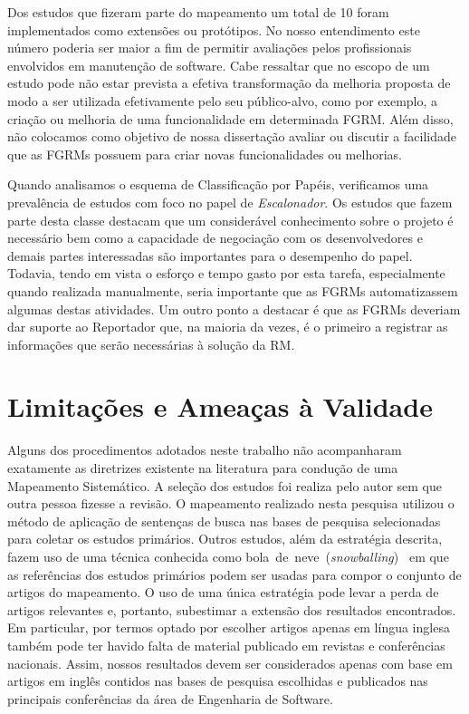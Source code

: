 Dos estudos que fizeram parte do mapeamento um total de 10 foram implementados
como extensões ou protótipos. No nosso entendimento este número poderia ser
maior a fim de permitir avaliações pelos profissionais envolvidos em manutenção
de software. Cabe ressaltar que no escopo de um estudo pode não estar prevista
a efetiva transformação da melhoria proposta de modo a ser utilizada
efetivamente pelo seu público-alvo, como por exemplo, a criação ou melhoria de
uma funcionalidade em determinada FGRM\@. Além disso, não colocamos como
objetivo de nossa dissertação avaliar ou discutir a facilidade que as FGRMs
possuem para criar novas funcionalidades ou melhorias.

Quando analisamos o esquema de Classificação por Papéis, verificamos uma
prevalência de estudos com foco no papel de \textit{Escalonador}. Os estudos
que fazem parte desta classe destacam que um considerável conhecimento sobre o
projeto é necessário bem como a capacidade de negociação com os desenvolvedores
e demais partes interessadas são importantes para o desempenho do papel.
Todavia, tendo em vista o esforço e tempo gasto por esta tarefa, especialmente
quando realizada ma\-nu\-al\-men\-te, seria importante que as FGRMs
automatizassem algumas destas atividades. Um outro ponto a destacar é que as
FGRMs deveriam dar suporte ao Reportador que, na maioria da vezes, é o primeiro
a registrar as informações que serão necessárias à solução da RM\@.

\section{Limitações e Ameaças à Validade}\label{sec:map_limitacoes_ameacas}

Alguns dos procedimentos adotados neste trabalho não acompanharam exatamente as
diretrizes existente na literatura para condução de uma Mapeamento Sistemático.
A seleção dos estudos foi realiza pelo autor sem que outra pessoa fizesse a
revisão. O mapeamento realizado nesta pesquisa utilizou o método de aplicação
de sentenças de busca nas bases de pesquisa selecionadas para coletar os
estudos primários. Outros estudos, além da estratégia descrita, fazem uso de
uma técnica conhecida como
bola~de~neve~(\textit{snowballing})~\cite{wohlin2014guidelines} em que as
referências dos estudos primários podem ser usadas para compor o conjunto de
artigos do mapeamento. O uso de uma única estratégia pode levar a perda de
artigos relevantes e, portanto, subestimar a extensão dos resultados
encontrados. Em particular, por termos optado por escolher artigos apenas em
língua inglesa também pode ter havido falta de material publicado em revistas e
conferências nacionais. Assim, nossos resultados devem ser considerados apenas
com base em artigos em inglês contidos nas bases de pesquisa escolhidas e
publicados nas principais conferências da área de Engenharia de Software.

